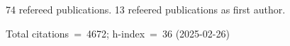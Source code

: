 74 refereed publications. 13 refeered publications as first author.

Total citations~=~4672; h-index~=~36 (2025-02-26)